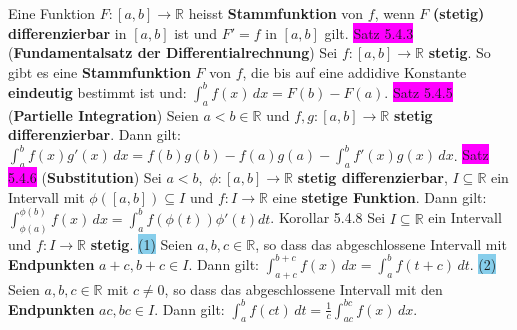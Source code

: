 \documentclass[landscape, 10pt]{article}
\newcommand{\R}{\mathbb{R}}
\begin{document}
\begin{multicols}{3}
                Eine Funktion 
                \textcolor{NavyBlue}{$F:[a,b]\longrightarrow\R$} heisst 
                \textbf{Stammfunktion} von 
         \textcolor{NavyBlue}{$f$}, wenn \textcolor{NavyBlue}{$F$} 
                \textbf{(stetig) differenzierbar} in 
                \textcolor{NavyBlue}{$[a,b]$}
                ist und \textcolor{NavyBlue}{$F'=f$} in \textcolor{NavyBlue}{$[a,b]$} gilt.
\colorbox{magenta}{Satz 5.4.3} (\textbf{Fundamentalsatz der Differentialrechnung}) 
                Sei \textcolor{NavyBlue}{$f:[a,b]\longrightarrow\R$} 
                \textbf{stetig}. So gibt es eine 
         \textbf{Stammfunktion} \textcolor{NavyBlue}{$F$} von \textcolor{NavyBlue}{$f$},
                die bis auf eine addidive Konstante \textbf{eindeutig} 
                bestimmt ist und: 
         \textcolor{NavyBlue}{$\int_a^bf(x)\,dx=F(b)-F(a)$}. 
\colorbox{magenta}{Satz 5.4.5} (\textbf{Partielle Integration}) 
                Seien \textcolor{NavyBlue}{$a<b\in\R$} und 
                \textcolor{NavyBlue}{$f,g:[a,b]\longrightarrow\R$}
                \textbf{stetig differenzierbar}. Dann gilt: 
         \textcolor{NavyBlue}{$\int_a^bf(x)g'(x)\,dx
                =f(b)g(b)-f(a)g(a)-\int_a^bf'(x)g(x)\,dx$}. 
\colorbox{magenta}{Satz 5.4.6} (\textbf{Substitution}) Sei 
                \textcolor{NavyBlue}{$a<b$},\,
                \textcolor{NavyBlue}{$\phi:[a,b]\longrightarrow\R$}
                \textbf{stetig differenzierbar}, \textcolor{NavyBlue}{$I\subseteq\R$}
                ein Intervall mit \textcolor{NavyBlue}{$\phi([a,b])\subseteq I$}
         und \textcolor{NavyBlue}{$f:I\longrightarrow\R$} eine 
                \textbf{stetige Funktion}. Dann gilt: 
                \textcolor{NavyBlue}{$\int_{\phi(a)}^{\phi(b)}f(x)\,dx
                =\int_a^bf(\phi(t))\phi'(t)dt$}.
\colorbox{BurntOrange}{Korollar 5.4.8} Sei \textcolor{NavyBlue}{$I\subseteq\R$}
                ein Intervall und \textcolor{NavyBlue}{$f:I\longrightarrow\R$} 
                \textbf{stetig}. 
         \colorbox{SkyBlue}{(1)} Seien \textcolor{NavyBlue}{$a,b,c\in\R$}, 
                so dass das abgeschlossene Intervall 
                mit \textbf{Endpunkten} \textcolor{NavyBlue}{$a+c,b+c\in I$}. 
         Dann gilt: 
                \textcolor{NavyBlue}{$\int_{a+c}^{b+c}f(x)\,dx=\int_a^bf(t+c)\,dt$}.
         \colorbox{SkyBlue}{(2)} Seien \textcolor{NavyBlue}{$a,b,c\in\R$} mit 
                \textcolor{NavyBlue}{$c\neq0$}, so dass das abgeschlossene Intervall mit den 
                \textbf{Endpunkten} \textcolor{NavyBlue}{$ac,bc\in I$}. 
         Dann gilt: 
                \textcolor{NavyBlue}{$\int_a^bf(ct)\,dt=\frac{1}{c}\int_{ac}^{bc}f(x)\,dx$}.

\end{multicols}
\end{document}
